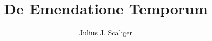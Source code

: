 \documentclass[12pt,twoside,a4paper]{book}
\newcommand{\setheaders}[2]{%
\markboth{\sc{\hfill{}#1\hfill}}%
         {\sc{\hfill{}#2\hfill}}%
}
\begin{document}
\title{De Emendatione Temporum}
\author{Julius J. Scaliger}
\pagestyle{myheadings}
\setheaders{}{}

%

\frontmatter





\setheaders{}{}

\tableofcontents{}

\mainmatter








\appendix





\listoftables

\backmatter


\end{document}
